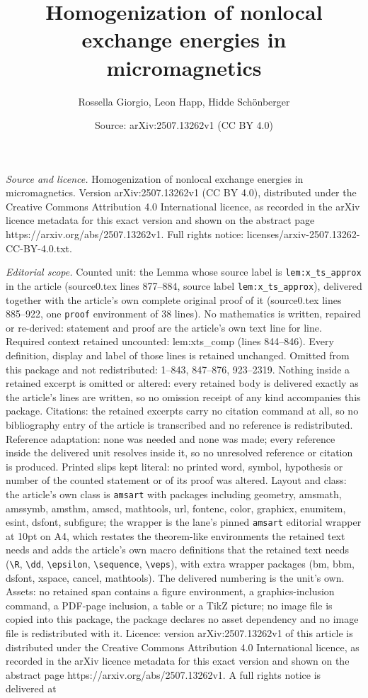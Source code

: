 \documentclass[10pt,a4paper]{amsart}
\title[Homogenization of nonlocal exchange energies in micromagneti]{Homogenization of nonlocal exchange energies in micromagnetics}
\author{Rossella Giorgio, Leon Happ, Hidde Sch\"onberger}
\date{Source: arXiv:2507.13262v1 (CC BY 4.0)}
\begin{document}
\maketitle

\noindent\emph{Source and licence.} Homogenization of nonlocal exchange energies in micromagnetics. Version arXiv:2507.13262v1 (CC BY 4.0), distributed under the Creative Commons Attribution 4.0 International licence, as recorded in the arXiv licence metadata for this exact version and shown on the abstract page https://arxiv.org/abs/2507.13262v1. Full rights notice: licenses/arxiv-2507.13262-CC-BY-4.0.txt.\par\smallskip

\noindent\textit{Editorial scope.} Counted unit: the Lemma whose source label is \texttt{lem:x\_ts\_approx} in the article (source0.tex lines 877--884, source label \texttt{lem:x\_ts\_approx}), delivered together with the article's own complete original proof of it (source0.tex lines 885--922, one \texttt{proof} environment of 38 lines). No mathematics is written, repaired or re-derived: statement and proof are the article's own text line for line. Required context retained uncounted: lem:xts\_comp (lines 844--846). Every definition, display and label of those lines is retained unchanged. Omitted from this package and not redistributed: 1--843, 847--876, 923--2319. Nothing inside a retained excerpt is omitted or altered: every retained body is delivered exactly as the article's lines are written, so no omission receipt of any kind accompanies this package. Citations: the retained excerpts carry no citation command at all, so no bibliography entry of the article is transcribed and no reference is redistributed. Reference adaptation: none was needed and none was made; every reference inside the delivered unit resolves inside it, so no unresolved reference or citation is produced. Printed slips kept literal: no printed word, symbol, hypothesis or number of the counted statement or of its proof was altered. Layout and class: the article's own class is \texttt{amsart} with packages including geometry, amsmath, amssymb, amsthm, amscd, mathtools, url, fontenc, color, graphicx, enumitem, esint, dsfont, subfigure; the wrapper is the lane's pinned \texttt{amsart} editorial wrapper at 10pt on A4, which restates the theorem-like environments the retained text needs and adds the article's own macro definitions that the retained text needs (\texttt{\textbackslash R}, \texttt{\textbackslash dd}, \texttt{\textbackslash epsilon}, \texttt{\textbackslash sequence}, \texttt{\textbackslash veps}), with extra wrapper packages (bm, bbm, dsfont, xspace, cancel, mathtools). The delivered numbering is the unit's own. Assets: no retained span contains a figure environment, a graphics-inclusion command, a PDF-page inclusion, a table or a TikZ picture; no image file is copied into this package, the package declares no asset dependency and no image file is redistributed with it. Licence: version arXiv:2507.13262v1 of this article is distributed under the Creative Commons Attribution 4.0 International licence, as recorded in the arXiv licence metadata for this exact version and shown on the abstract page https://arxiv.org/abs/2507.13262v1. A full rights notice is delivered at 
\end{document}
